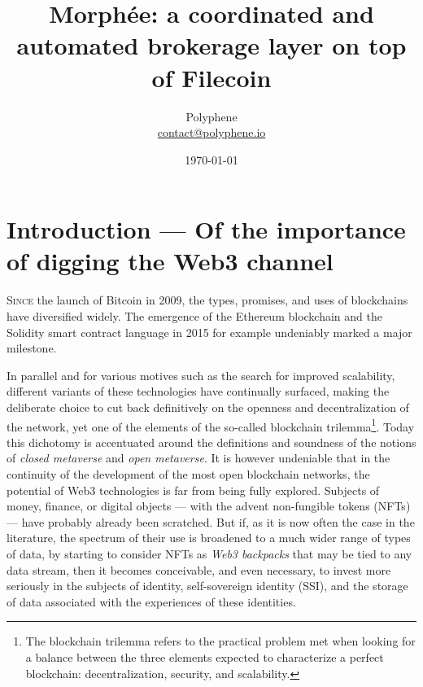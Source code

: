 \documentclass[twoside,twocolumn]{article}
\title{Morphée: a coordinated and automated brokerage layer on top of Filecoin} %
\author{%
\textsc{}
\normalsize Polyphene \\ %
\normalsize \href{mailto:contact@polyphene.io}{contact@polyphene.io} %
}
\date{\today} %
\begin{document}
\maketitle


\section{Introduction — Of the importance of digging the Web3 channel}

\lettrine[nindent=0em,lines=3]{S}{ince} the launch of Bitcoin in 2009, the types, promises, and uses of blockchains have diversified widely.
The emergence of the Ethereum blockchain and the Solidity smart contract language in 2015 for example undeniably marked a major milestone.

In parallel and for various motives such as the search for improved scalability,
different variants of these technologies have continually surfaced, making the deliberate choice
to cut back definitively on the openness and decentralization of the network, yet one of the elements of the so-called blockchain trilemma\footnote{The
blockchain trilemma refers to the practical problem met when looking for a balance between the three elements
expected to characterize a perfect blockchain: decentralization, security, and scalability.}.
Today this dichotomy is accentuated around the definitions and soundness of the notions of \emph{closed metaverse} and \emph{open metaverse}.
It is however undeniable that in the continuity of the development of the most open blockchain networks,
the potential of Web3 technologies is far from being fully explored.
Subjects of money, finance, or digital objects — with the advent non-fungible tokens (NFTs) — have probably already been scratched.
But if, as it is now often the case in the literature, the spectrum of their use is broadened to a much wider range of types of data,
by starting to consider NFTs as \emph{Web3 backpacks} that may be tied to any data stream,
then it becomes conceivable, and even necessary, to invest more seriously in the subjects of identity,
self-sovereign identity (SSI), and the storage of data associated with the experiences of these identities.
\end{document}
